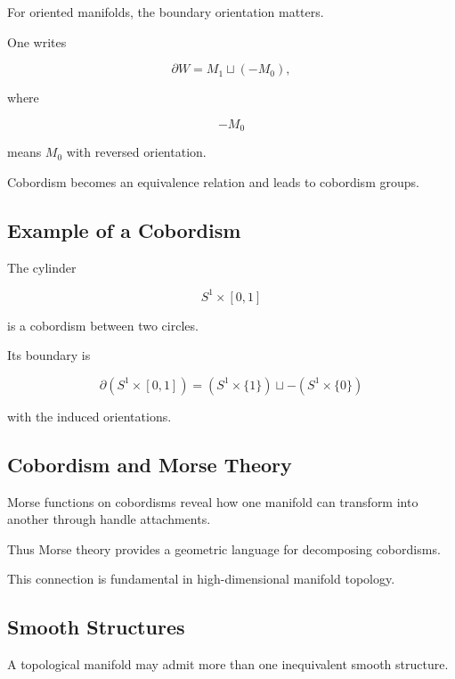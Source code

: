 For oriented manifolds, the boundary orientation matters.

One writes

\[
\boxed{
\partial W
=
M_1\sqcup(-M_0),
}
\]

where

\[
-M_0
\]

means \(M_0\) with reversed orientation.

Cobordism becomes an equivalence relation and leads to cobordism groups.

\subsection{Example of a Cobordism}
\label{subsec:cylinder-cobordism}

The cylinder

\[
\boxed{
S^1\times[0,1]
}
\]

is a cobordism between two circles.

Its boundary is

\[
\boxed{
\partial(S^1\times[0,1])
=
(S^1\times\{1\})
\sqcup
-(S^1\times\{0\})
}
\]

with the induced orientations.

\subsection{Cobordism and Morse Theory}
\label{subsec:cobordism-morse-theory}

Morse functions on cobordisms reveal how one manifold can transform into
another through handle attachments.

Thus Morse theory provides a geometric language for decomposing cobordisms.

This connection is fundamental in high-dimensional manifold topology.

\subsection{Smooth Structures}
\label{subsec:smooth-structures}

A topological manifold may admit more than one inequivalent smooth
structure.

